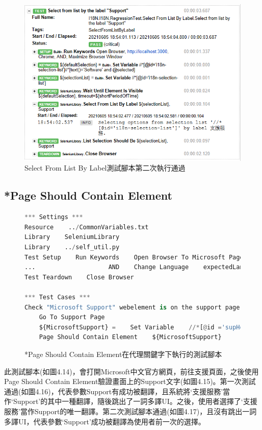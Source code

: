 \begin{figure}[H]
\includegraphics[width= \textwidth]{../論文截圖/4.1.4-3 select from list by label 2nd run.png}
\caption{Select From List By Label測試腳本第二次執行通過}
\end{figure}

\subsection{*Page Should Contain Element}
\begin{figure}[H]
\begin{lstlisting}[language={python}]
*** Settings ***
Resource    ../CommonVariables.txt
Library    SeleniumLibrary
Library    ../self_util.py
Test Setup    Run Keywords    Open Browser To Microsoft Page
...                    AND    Change Language    expectedLanguage=${language}
Test Teardown    Close Browser

*** Test Cases ***
Check "Microsoft Support" webelement is on the support page
    Go To Support Page
    ${MicrosoftSupport} =    Set Variable    //*[@id ='supHomeAndLandingPageHeaderContainer']//*[contains(text(), 'Support')]
    Page Should Contain Element    ${MicrosoftSupport}
\end{lstlisting}
\caption{*Page Should Contain Element在代理關鍵字下執行的測試腳本}
\end{figure}
此測試腳本(如圖4.14)，會打開Microsoft中文官方網頁，前往支援頁面，之後使用Page Should Contain Element驗證畫面上的Support文字(如圖4.15)。第一次測試通過(如圖4.16)，代表參數Support有成功被翻譯，且系統將‘支援服務’當作‘Support’的其中一種翻譯，隨後跳出了一詞多譯UI。之後，使用者選擇了‘支援服務’當作Support的唯一翻譯。第二次測試腳本通過(如圖4.17)，且沒有跳出一詞多譯UI，代表參數‘Support’成功被翻譯為使用者前一次的選擇。

